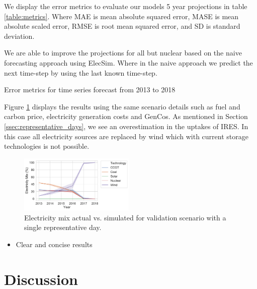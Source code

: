 \documentclass[final,3p,times,twocolumn,numbers]{elsarticle}
\begin{document}
We display the error metrics to evaluate our models 5 year projections in table \ref{table:metrics}. Where MAE is mean absolute squared error, MASE is mean absolute scaled error, RMSE is root mean squared error, and SD is standard deviation.

We are able to improve the projections for all but nuclear based on the naive forecasting approach using ElecSim. Where in the naive approach we predict the next time-step by using the last known time-step. 


\begin{table}[htb]
    \centering
{}
    \caption{Error metrics for time series forecast from 2013 to 2018}
    \label{table:metrics}
\end{table}

Figure \ref{fig:single_time_step_results} displays the results using the same scenario details such as fuel and carbon price, electricity generation costs and GenCos. As mentioned in Section \ref{ssec:representative_days}, we see an overestimation in the uptakes of IRES. In this case all electricity sources are replaced by wind which with current storage technologies is not possible.



\begin{figure}
\centering
\includegraphics[width=0.49\textwidth]{figures/results/yearly_time_step_scenario.pdf}
\caption{Electricity mix actual vs. simulated for validation scenario with a single representative day.}
\label{fig:single_time_step_results}
\end{figure}











\begin{itemize}
	\item Clear and concise results
\end{itemize}

\section{Discussion}
\label{sec:discussion}
\end{document}
